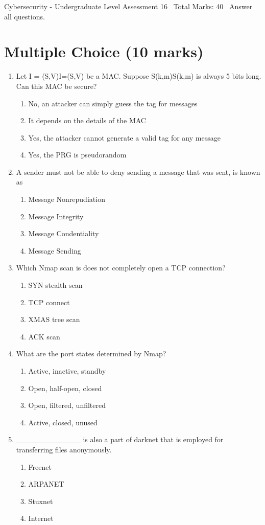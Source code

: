 \documentclass[12pt]{article}
\begin{document}
\begin{center}
Cybersecurity - Undergraduate Level Assessment 16 \
Total Marks: 40 \
Answer all questions.
\end{center}

\section*{Multiple Choice (10 marks)}
\begin{enumerate}[label=\arabic*.]
\item Let I = (S,V)I=(S,V) be a MAC. Suppose S(k,m)S(k,m) is always 5 bits long. Can this MAC be secure?
\begin{enumerate}[label=(\alph*)]
    \item No, an attacker can simply guess the tag for messages
    \item It depends on the details of the MAC
    \item Yes, the attacker cannot generate a valid tag for any message
    \item Yes, the PRG is pseudorandom
\end{enumerate}
\item A sender must not be able to deny sending a message that was sent, is known as
\begin{enumerate}[label=(\alph*)]
    \item Message Nonrepudiation
    \item Message Integrity
    \item Message Condentiality
    \item Message Sending
\end{enumerate}
\item Which Nmap scan is does not completely open a TCP connection?
\begin{enumerate}[label=(\alph*)]
    \item SYN stealth scan
    \item TCP connect
    \item XMAS tree scan
    \item ACK scan
\end{enumerate}
\item What are the port states determined by Nmap?
\begin{enumerate}[label=(\alph*)]
    \item Active, inactive, standby
    \item Open, half-open, closed
    \item Open, filtered, unfiltered
    \item Active, closed, unused
\end{enumerate}
\item \_\_\_\_\_\_\_\_\_\_\_\_ is also a part of darknet that is employed for transferring files anonymously.
\begin{enumerate}[label=(\alph*)]
    \item Freenet
    \item ARPANET
    \item Stuxnet
    \item Internet
\end{enumerate}
\end{enumerate}
\end{document}
